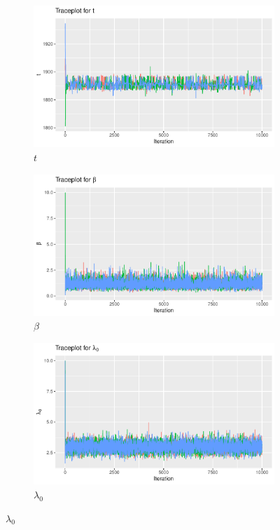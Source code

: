 \begin{figure}[H]
    \centering
    \begin{subfigure}[b]{0.49\textwidth}
        \centering
        \includegraphics[width = \textwidth]{Images/mixing_t_block.pdf}
        \caption{$t$}

    \end{subfigure}
    \begin{subfigure}[b]{0.49\textwidth}
        \centering
        \includegraphics[width = \textwidth]{Images/mixing_beta_block.pdf}
        \caption{$\beta$}

    \end{subfigure}
    \begin{subfigure}[b]{0.49\textwidth}
        \centering
        \includegraphics[width = \textwidth]{Images/mixing_lambda_0_block.pdf}
        \caption{$\lambda_0$}


\end{subfigure}
\end{figure}
